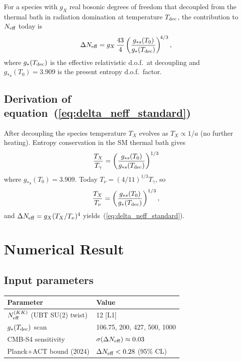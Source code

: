 \documentclass[12pt,a4paper]{article}
\begin{document}
For a species with $g_X$ real bosonic degrees of freedom that decoupled
from the thermal bath in radiation domination at temperature $T_{\rm dec}$,
the contribution to $N_{\rm eff}$ today is
\begin{equation}
  \label{eq:delta_neff_standard}
  \Delta N_{\rm eff} = g_X\,\frac{43}{4}\left(\frac{g_{*s}(T_0)}{g_*(T_{\rm dec})}\right)^{\!4/3},
\end{equation}
where $g_*(T_{\rm dec})$ is the effective relativistic d.o.f.\ at decoupling
and $g_{*s}(T_0)=3.909$ is the present entropy d.o.f.\ factor.

\subsection*{Derivation of equation~(\ref{eq:delta_neff_standard})}

After decoupling the species temperature $T_X$ evolves as
$T_X \propto 1/a$ (no further heating).  Entropy conservation
in the SM thermal bath gives
\[
  \frac{T_X}{T_\gamma} = \left(\frac{g_{*s}(T_0)}{g_{*s}(T_{\rm dec})}\right)^{1/3}
\]
where $g_{*s}(T_0)=3.909$.
Today $T_\nu = (4/11)^{1/3} T_\gamma$, so
\[
  \frac{T_X}{T_\nu} = \left(\frac{g_{*s}(T_0)}{g_*(T_{\rm dec})}\right)^{1/3},
\]
and $\Delta N_{\rm eff} = g_X(T_X/T_\nu)^4$ yields~(\ref{eq:delta_neff_standard}).

\section{Numerical Result}
\label{sec:result}

\subsection{Input parameters}

\begin{center}
\begin{tabular}{ll}
\toprule
Parameter & Value \\
\midrule
$N_{\rm eff}^{(KK)}$ (UBT SU(2) twist) & 12 [L1] \\
$g_*(T_{\rm dec})$ scan & 106.75, 200, 427, 500, 1000 \\
CMB-S4 sensitivity & $\sigma(\Delta N_{\rm eff}) \approx 0.03$ \\
Planck+ACT bound (2024) & $\Delta N_{\rm eff} < 0.28$ (95\% CL) \\
\bottomrule
\end{tabular}
\end{center}
\end{document}
